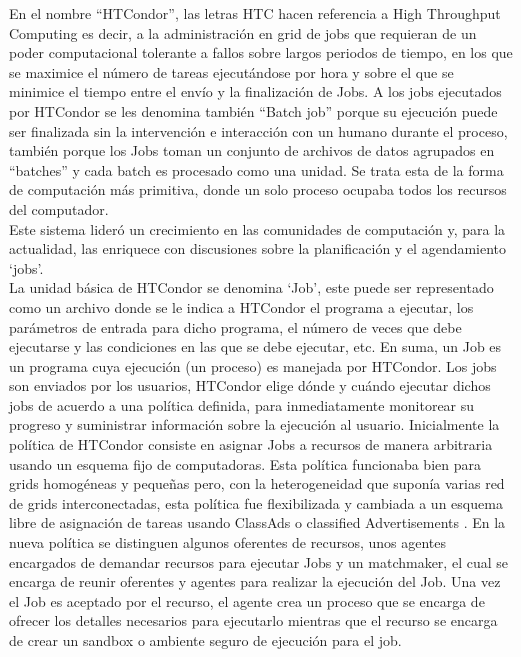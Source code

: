 En el nombre “HTCondor”, las letras HTC hacen referencia a High Throughput Computing es decir, a la administración en grid de jobs que requieran de un poder computacional tolerante a fallos sobre largos periodos de tiempo, en los que se maximice el número de tareas ejecutándose por hora y sobre el que se minimice el tiempo entre el envío y la finalización de Jobs. A los jobs ejecutados por HTCondor se les denomina también “Batch job” porque su ejecución puede ser finalizada sin la intervención e interacción con un humano durante el proceso, también porque los Jobs toman un conjunto de archivos de datos agrupados en “batches” y cada batch es procesado como una unidad. Se trata esta de la forma de computación más primitiva, donde un solo proceso ocupaba todos los recursos del computador.\\

Este sistema lideró un crecimiento en las comunidades de computación y, para la actualidad, las enriquece con discusiones sobre la planificación y el agendamiento ‘jobs’.\\

La unidad básica de HTCondor se denomina ‘Job’, este puede ser representado como un archivo donde se le indica a HTCondor el programa a ejecutar, los parámetros de entrada para dicho programa, el número de veces que debe ejecutarse y las condiciones en las que se debe ejecutar, etc. En suma, un Job es un programa cuya ejecución (un proceso) es manejada por HTCondor. Los jobs son enviados por los usuarios, HTCondor elige dónde y cuándo ejecutar dichos jobs de acuerdo a una política definida, para inmediatamente monitorear su progreso y suministrar información sobre la ejecución al usuario.
Inicialmente la política de HTCondor consiste en asignar Jobs a recursos de manera arbitraria usando un esquema fijo de computadoras. Esta política funcionaba bien para grids homogéneas y pequeñas pero, con la heterogeneidad que suponía varias red de grids interconectadas, esta política fue flexibilizada y cambiada a un esquema libre de asignación de tareas usando ClassAds o classified Advertisements \cite{Tannenbaum:2001:CDJ:509876.509893}. En la nueva política se distinguen algunos oferentes de recursos, unos agentes encargados de demandar recursos para ejecutar Jobs y un matchmaker, el cual se encarga de reunir oferentes y agentes para realizar la ejecución del Job. Una vez el Job es aceptado por el recurso, el agente crea un proceso que se encarga de ofrecer los detalles necesarios para ejecutarlo mientras que el recurso se encarga de crear un sandbox o ambiente seguro de ejecución para el job.\\

